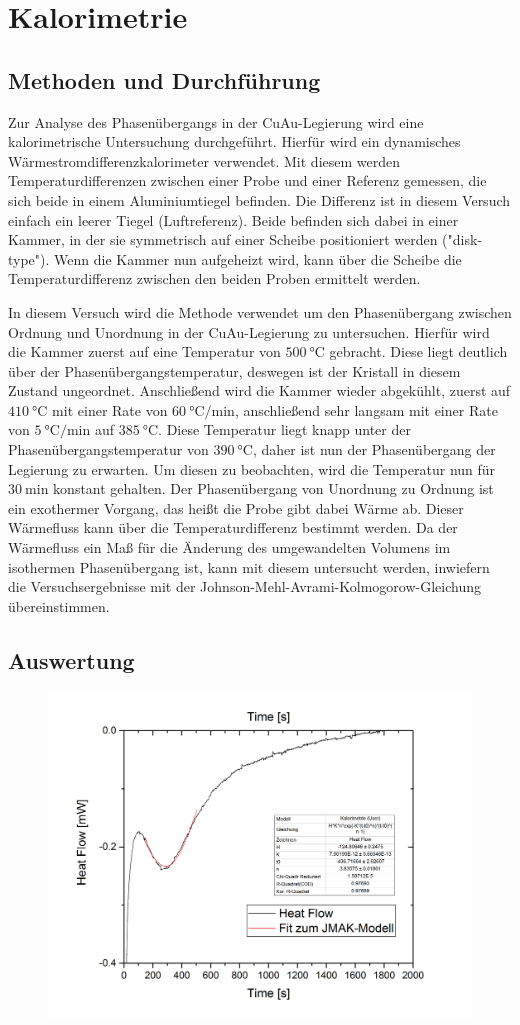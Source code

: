 \documentclass[
	a4paper,
	12pt,
	pagesize,
	ngerman
]{scrartcl}
\begin{document}
\section{Kalorimetrie}
\subsection{Methoden und Durchführung}
Zur Analyse des Phasenübergangs in der CuAu-Legierung wird eine kalorimetrische Untersuchung durchgeführt. Hierfür wird ein dynamisches Wärmestromdifferenzkalorimeter verwendet. Mit diesem werden Temperaturdifferenzen zwischen einer Probe und einer Referenz gemessen, die sich beide in einem Aluminiumtiegel befinden. Die Differenz ist in diesem Versuch einfach ein leerer Tiegel (Luftreferenz). Beide befinden sich dabei in einer Kammer, in der sie symmetrisch auf einer Scheibe positioniert werden ("disk-type"). Wenn die Kammer nun aufgeheizt wird, kann über die Scheibe die Temperaturdifferenz zwischen den beiden Proben ermittelt werden.

In diesem Versuch wird die Methode verwendet um den Phasenübergang zwischen Ordnung und Unordnung in der CuAu-Legierung zu untersuchen. Hierfür wird die Kammer zuerst auf eine Temperatur von $\SI{500}{\degreeCelsius}$ gebracht. Diese liegt deutlich über der Phasenübergangstemperatur, deswegen ist der Kristall in diesem Zustand ungeordnet. Anschließend wird die Kammer wieder abgekühlt, zuerst auf $\SI{410}{\degreeCelsius}$ mit einer Rate von $\SI{60}{\degreeCelsius/\minute}$, anschließend sehr langsam mit einer Rate von $\SI{5}{\degreeCelsius/\minute}$ auf $\SI{385}{\degreeCelsius}$. Diese Temperatur liegt knapp unter der Phasenübergangstemperatur von $\SI{390}{\degreeCelsius}$, daher ist nun der Phasenübergang der Legierung zu erwarten. Um diesen zu beobachten, wird die Temperatur nun für $\SI{30}{\minute}$ konstant gehalten. Der Phasenübergang von Unordnung zu Ordnung ist ein exothermer Vorgang, das heißt die Probe gibt dabei Wärme ab. Dieser Wärmefluss kann über die Temperaturdifferenz bestimmt werden. Da der Wärmefluss ein Maß für die Änderung des umgewandelten Volumens im isothermen Phasenübergang ist, kann mit diesem untersucht werden, inwiefern die Versuchsergebnisse mit der Johnson-Mehl-Avrami-Kolmogorow-Gleichung übereinstimmen.

\subsection{Auswertung}
\begin{figure}[h]
	\centering
	\includegraphics[scale=0.6]{Graph3.png}
	\caption{}
	\label{3}
\end{figure}	
\end{document}
